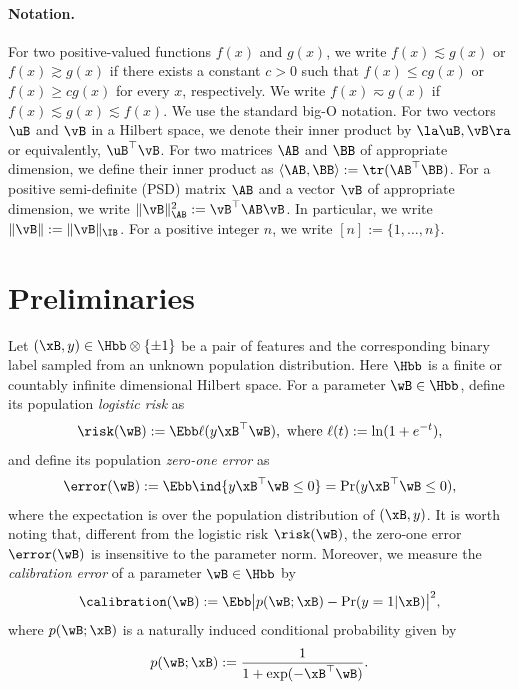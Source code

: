 \documentclass[11pt]{article}
\begin{document}
\paragraph{Notation.}
For two positive-valued functions $f(x)$ and $g(x)$, we write $f(x)\lesssim g(x)$ or $f(x)\gtrsim g(x)$
if there exists a constant $c>0$ such that $f(x) \le cg(x)$ or $f(x) \ge cg(x)$ for every $x$, respectively. 
We write $f(x) \eqsim g(x) $ if $f(x) \lesssim g(x) \lesssim f(x)$.
We use the standard big-O notation. 
For two vectors $\uB$ and $\vB$ in a Hilbert space, we denote their inner product by $\la\uB, \vB\ra$ or equivalently, $\uB^\top \vB$.
For two matrices $\AB$ and $\BB$ of appropriate dimension, we define their inner product as $\langle \AB, \BB \rangle := \tr(\AB^\top \BB)$.
For a positive semi-definite (PSD) matrix $\AB$ and a vector $\vB$ of appropriate dimension, we write $\|\vB\|_{\AB}^2 := \vB^\top \AB \vB$. In particular, we write $\|\vB \| := \|\vB \|_\IB$.
For a positive integer $n$, we write $[n]:=\{1,\dots,n\}$.




\section{Preliminaries}\label{sec:preliminary}


Let $(\xB,y)\in\Hbb\otimes \{\pm 1\}$ be a pair of features and the corresponding binary label sampled from an unknown population distribution.
Here $\Hbb$ is a finite or countably infinite dimensional Hilbert space.  
For a parameter $\wB\in\Hbb$, define its population \emph{logistic risk} as
\begin{align*}
    \risk(\wB):= \Ebb \ell(y \xB^\top \wB),\ \text{where} \ \ell(t) := \ln(1+e^{-t}),
\end{align*}
and define its population \emph{zero-one error} as
\begin{align*}
    \error(\wB):= \Ebb \ind{y\xB^\top \wB \le 0} 
    = \Pr(y\xB^\top \wB \le 0),
\end{align*}
where the expectation is over the population distribution of $(\xB,y)$.
It is worth noting that, different from the logistic risk $\risk(\wB)$, the zero-one error $\error(\wB)$ is insensitive to the parameter norm.
Moreover, we measure the \emph{calibration error} of a parameter $\wB\in\Hbb$ by
\begin{align*}
    \calibration(\wB):= \Ebb \big|p(\wB;\xB) - \Pr(y=1|\xB)\big|^2,
\end{align*}
where $p(\wB;\xB)$ is a naturally induced conditional probability given by 
\begin{align*}
    p(\wB;\xB) := \frac{1}{1+\exp(-\xB^\top\wB)}.
\end{align*}
\end{document}
